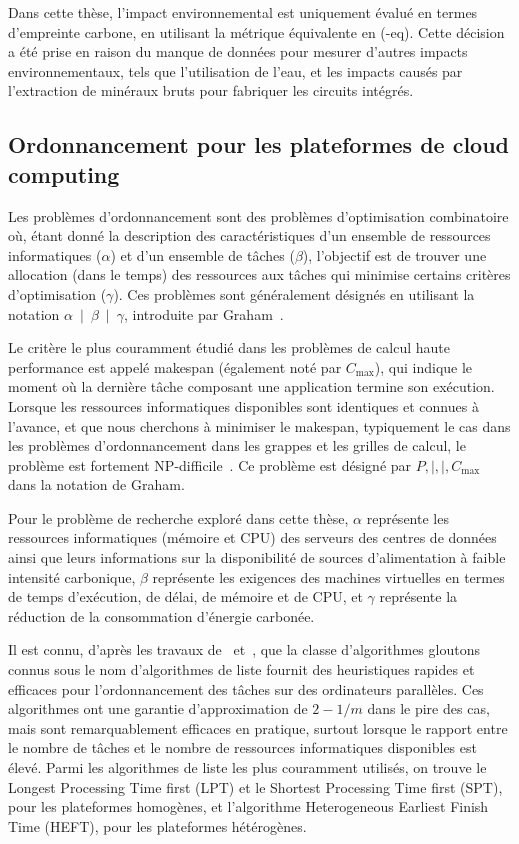 Dans cette thèse, l'impact environnemental est uniquement évalué en termes d'empreinte carbone, en utilisant la métrique équivalente en  (-eq). Cette décision a été prise en raison du manque de données pour mesurer d'autres impacts environnementaux, tels que l'utilisation de l'eau, et les impacts causés par l'extraction de minéraux bruts pour fabriquer les circuits intégrés.



\subsection{Ordonnancement pour les plateformes de cloud computing}
\label{sec:scheduling_cloud_resume}

Les problèmes d'ordonnancement sont des problèmes d'optimisation combinatoire où, étant donné la description des caractéristiques d'un ensemble de ressources informatiques ($\alpha$) et d'un ensemble de tâches ($\beta$), l'objectif est de trouver une allocation (dans le temps) des ressources aux tâches qui minimise certains critères d'optimisation ($\gamma$). Ces problèmes sont généralement désignés en utilisant la notation \mbox{$\alpha$ $\vert$ $\beta$ $\vert$ $\gamma$}, introduite par Graham~\citep{graham}.

Le critère le plus couramment étudié dans les problèmes de calcul haute performance est appelé makespan (également noté par $C_{\max}$), qui indique le moment où la dernière tâche composant une application termine son exécution. Lorsque les ressources informatiques disponibles sont identiques et connues à l'avance, et que nous cherchons à minimiser le makespan, typiquement le cas dans les problèmes d'ordonnancement dans les grappes et les grilles de calcul, le problème est fortement NP-difficile~\citep{Garey}. Ce problème est désigné par $P,\vert,\vert,C_{\max}$ dans la notation de Graham.

Pour le problème de recherche exploré dans cette thèse, $\alpha$ représente les ressources informatiques (mémoire et CPU) des serveurs des centres de données ainsi que leurs informations sur la disponibilité de sources d'alimentation à faible intensité carbonique, $\beta$ représente les exigences des machines virtuelles en termes de temps d'exécution, de délai, de mémoire et de CPU, et $\gamma$ représente la réduction de la consommation d'énergie carbonée.


Il est connu, d'après les travaux de~\citet{graham} et~\citet{Garey}, que la classe d'algorithmes gloutons connus sous le nom d'algorithmes de liste fournit des heuristiques rapides et efficaces pour l'ordonnancement des tâches sur des ordinateurs parallèles. Ces algorithmes ont une garantie d'approximation de $2 -1 /m$ dans le pire des cas, mais sont remarquablement efficaces en pratique, surtout lorsque le rapport entre le nombre de tâches et le nombre de ressources informatiques disponibles est élevé. Parmi les algorithmes de liste les plus couramment utilisés, on trouve le Longest Processing Time first (LPT) et le Shortest Processing Time first (SPT), pour les plateformes homogènes, et l'algorithme Heterogeneous Earliest Finish Time (HEFT), pour les plateformes hétérogènes.

